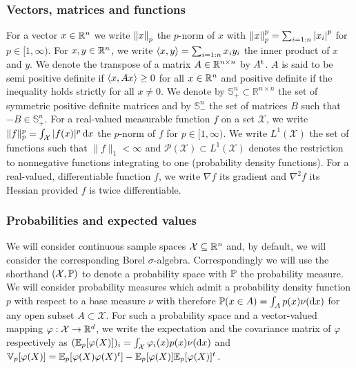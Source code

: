 \subsubsection{Vectors, matrices and functions} 
For a vector $x\in\R^{n}$ we write $\norm{x}{p}$ the $p$-norm of $x$ with $\norm{x}{p}^{p}=\sum_{i=1:n}\abs{x_{i}}^{p}$ for $p\in[1,\infty)$. 
For $x,y\in\R^{n}$, we write $\scal{x,y}=\sum_{i=1:n}x_{i}y_{i}$ the inner product of $x$ and $y$. 
We denote the transpose of a matrix $A\in\R^{n\times n}$ by $A\transp$. $A$ is said to be semi positive definite if $\scal{x,Ax}\ge 0$ for all $x\in\R^{n}$ and positive definite if the inequality holds strictly for all $x\neq 0$. We denote by $\mathbb S_+^{n}\subset \mathbb R^{n\times n}$ the set of symmetric positive definite matrices and by $\mathbb S_-^{n}$ the set of matrices $B$ such that $-B\in\mathbb S_+^{n}$.
For a real-valued measurable function $f$ on a set $\mathcal X$, we write $\|f\|_{p}^{p}=\int_{\mathcal X} |f(x)|^{p}\dx$ the $p$-norm of $f$ for $p\in[1,\infty)$. 
We write $L^{1}(\mathcal X)$ the set of functions such that $\|f\|_{1}<\infty$ and $\mathcal P(\mathcal X) \subset L^{1}(\mathcal X)$ denotes the restriction to nonnegative functions integrating to one (probability density functions). 
For a real-valued, differentiable function $f$, we write $\nabla f$ its gradient and $\nabla^{2} f$ its Hessian provided $f$ is twice differentiable.

\subsubsection{Probabilities and expected values}
We will consider continuous sample spaces $\mathcal X\subseteq \R^{n}$ and, by default, we will consider the corresponding Borel $\sigma$-algebra. Correspondingly we will use the shorthand $(\mathcal X,\P)$ to denote a probability space with $\P$ the probability measure. We will consider probability measures which admit a probability density function $p$ with respect to a base measure $\nu$ with therefore $\P(x\in A)=\int_{A}p(x)\nudx$ for any open subset $A\subset \mathcal X$. For such a probability space and a vector-valued mapping $\varphi:\mathcal X\to\R^{d}$, we write the expectation and the covariance matrix of $\varphi$ respectively as $(\E_{p}[\varphi(X)])_{i}=\int_{\mathcal X}\varphi_{i}(x)p(x)\nudx$ and $\V_{p}[\varphi(X)]=\E_{p}[\varphi(X)\varphi(X)^{t}]-\E_{p}[\varphi(X)]\E_{p}[\varphi(X)]^{t}$.
 
